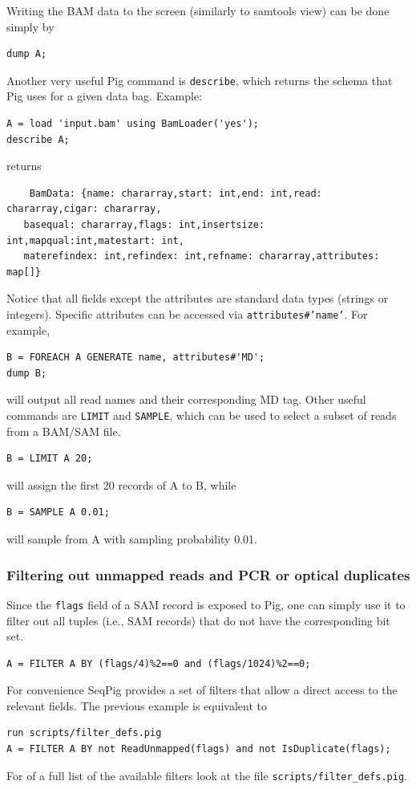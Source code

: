 Writing the BAM data to the screen (similarly to samtools view)
can be done simply by
\begin{lstlisting}
dump A;
\end{lstlisting}
Another very useful Pig command is {\tt describe}, which returns the schema that Pig
uses for a given data bag. Example:
\begin{lstlisting}
A = load 'input.bam' using BamLoader('yes');
describe A;
\end{lstlisting}
returns
\begin{lstlisting}  
	BamData: {name: chararray,start: int,end: int,read: chararray,cigar: chararray,
   basequal: chararray,flags: int,insertsize: int,mapqual:int,matestart: int,
   materefindex: int,refindex: int,refname: chararray,attributes: map[]}
\end{lstlisting}
Notice that all fields except the attributes are standard data types (strings
or integers). Specific attributes can be accessed via {\tt attributes\#'name'}. For
example,
\begin{lstlisting} 
B = FOREACH A GENERATE name, attributes#'MD';
dump B;
\end{lstlisting}
will output all read names and their corresponding MD tag.
Other useful commands are {\tt LIMIT} and {\tt SAMPLE}, which can be used to
select a subset of reads from a BAM/SAM file.
\begin{lstlisting} 
B = LIMIT A 20;
\end{lstlisting}
will assign the first 20 records of A to B, while
\begin{lstlisting}
B = SAMPLE A 0.01;
\end{lstlisting}
will sample from A with sampling probability 0.01.

\subsubsection{Filtering out unmapped reads and PCR or optical duplicates}
Since the {\tt flags} field of a SAM record is exposed to Pig, one can simply
use it to filter out all tuples (i.e., SAM records) that do not have the
corresponding bit set.
\begin{lstlisting}
A = FILTER A BY (flags/4)%2==0 and (flags/1024)%2==0;
\end{lstlisting}
For convenience SeqPig provides a set of filters that allow a direct access
to the relevant fields. The previous example is equivalent to
\begin{lstlisting}
run scripts/filter_defs.pig
A = FILTER A BY not ReadUnmapped(flags) and not IsDuplicate(flags);
\end{lstlisting}
For of a full list of the available filters look at the file {\tt scripts/filter\_defs.pig}.


